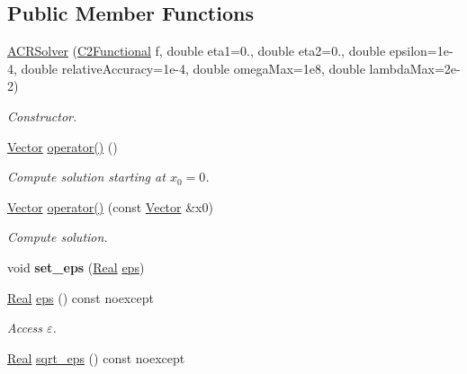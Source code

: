 \subsection*{\-Public \-Member \-Functions}
\begin{DoxyCompactItemize}
\item 
\hyperlink{classSpacy_1_1ACR_1_1ACRSolver_a2b442c8c3149e3d9ba866d9d60c8e014}{\-A\-C\-R\-Solver} (\hyperlink{classSpacy_1_1C2Functional}{\-C2\-Functional} f, double eta1=0., double eta2=0., double epsilon=1e-\/4, double relative\-Accuracy=1e-\/4, double omega\-Max=1e8, double lambda\-Max=2e-\/2)
\begin{DoxyCompactList}\small\item\em \-Constructor. \end{DoxyCompactList}\item 
\hypertarget{classSpacy_1_1ACR_1_1ACRSolver_ae68748adce75b5762ac7005024e29974}{\hyperlink{classSpacy_1_1Vector}{\-Vector} \hyperlink{classSpacy_1_1ACR_1_1ACRSolver_ae68748adce75b5762ac7005024e29974}{operator()} ()}\label{classSpacy_1_1ACR_1_1ACRSolver_ae68748adce75b5762ac7005024e29974}

\begin{DoxyCompactList}\small\item\em \-Compute solution starting at $x_0=0$. \end{DoxyCompactList}\item 
\hyperlink{classSpacy_1_1Vector}{\-Vector} \hyperlink{classSpacy_1_1ACR_1_1ACRSolver_ac7bc2ff6568728c4bd79f49f3596d2bc}{operator()} (const \hyperlink{classSpacy_1_1Vector}{\-Vector} \&x0)
\begin{DoxyCompactList}\small\item\em \-Compute solution. \end{DoxyCompactList}\item 
\hypertarget{classSpacy_1_1Mixin_1_1Eps_a818ab6dfab5e4eea583e1302bcc621f8}{void {\bfseries set\-\_\-eps} (\hyperlink{classSpacy_1_1Real}{\-Real} \hyperlink{classSpacy_1_1Mixin_1_1Eps_a812b99b0abc1d78a34b4114907f23f52}{eps})}\label{classSpacy_1_1Mixin_1_1Eps_a818ab6dfab5e4eea583e1302bcc621f8}

\item 
\hypertarget{classSpacy_1_1Mixin_1_1Eps_a812b99b0abc1d78a34b4114907f23f52}{\hyperlink{classSpacy_1_1Real}{\-Real} \hyperlink{classSpacy_1_1Mixin_1_1Eps_a812b99b0abc1d78a34b4114907f23f52}{eps} () const noexcept}\label{classSpacy_1_1Mixin_1_1Eps_a812b99b0abc1d78a34b4114907f23f52}

\begin{DoxyCompactList}\small\item\em \-Access $\varepsilon$. \end{DoxyCompactList}\item 
\hypertarget{classSpacy_1_1Mixin_1_1Eps_a1c1b0ed7f14ed4967dc7da9295a136d4}{\hyperlink{classSpacy_1_1Real}{\-Real} \hyperlink{classSpacy_1_1Mixin_1_1Eps_a1c1b0ed7f14ed4967dc7da9295a136d4}{sqrt\-\_\-eps} () const noexcept}\label{classSpacy_1_1Mixin_1_1Eps_a1c1b0ed7f14ed4967dc7da9295a136d4}


\end{DoxyCompactItemize}
